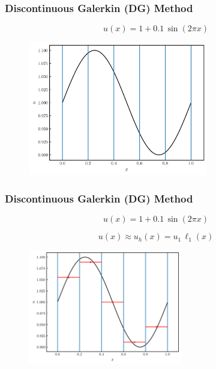 \documentclass{beamer}
\begin{document}
\begin{frame}
\frametitle{Discontinuous Galerkin (DG) Method}

  \Fontvi

  \begin{equation*}
    u\left(x\right)=1+0.1\,\sin\left(2\pi x\right)
  \end{equation*}

  \begin{figure}[htb!]
    \centering
    \includegraphics[width=0.7\textwidth]{fig.sineWithLines.png}
  \end{figure}

\end{frame}

\begin{frame}
\frametitle{Discontinuous Galerkin (DG) Method}

  \Fontvi

  \begin{equation*}
    u\left(x\right)=1+0.1\,\sin\left(2\pi x\right)
  \end{equation*}

  \begin{equation*}
    u\left(x\right)\approx u_{h}\left(x\right)=u_{1}\,\ell_{1}\left(x\right)
  \end{equation*}

  \begin{figure}[htb!]
    \centering
    \includegraphics[width=0.6\textwidth]{fig.sineWithLines_DG0.png}
  \end{figure}

\end{frame}
\end{document}
